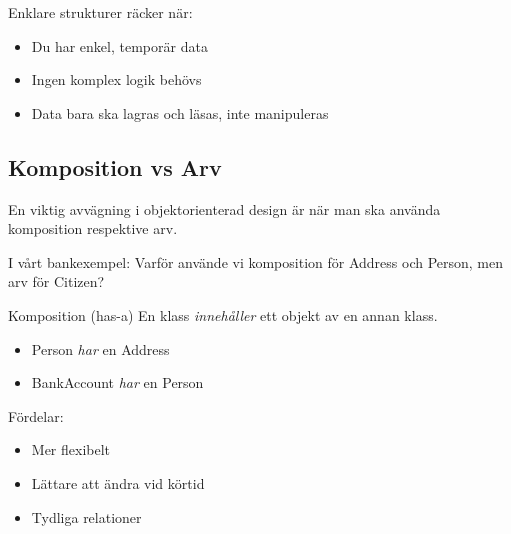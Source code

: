 Enklare strukturer räcker när:
\begin{itemize}
  \item Du har enkel, temporär data
  \item Ingen komplex logik behövs
  \item Data bara ska lagras och läsas, inte manipuleras
\end{itemize}

\subsection{Komposition vs Arv}

En viktig avvägning i objektorienterad design är när man ska använda 
komposition respektive arv.

\begin{exercise}
  I vårt bankexempel: Varför använde vi komposition för Address och Person, 
  men arv för Citizen?
\end{exercise}

\begin{frame}[fragile]
  \begin{block}{Komposition (has-a)}
    En klass \emph{innehåller} ett objekt av en annan klass.
    \begin{itemize}
      \item Person \emph{har} en Address
      \item BankAccount \emph{har} en Person
    \end{itemize}
    
    Fördelar:
    \begin{itemize}
      \item Mer flexibelt
      \item Lättare att ändra vid körtid
      \item Tydliga relationer
    \end{itemize}
  \end{block}
\end{frame}

